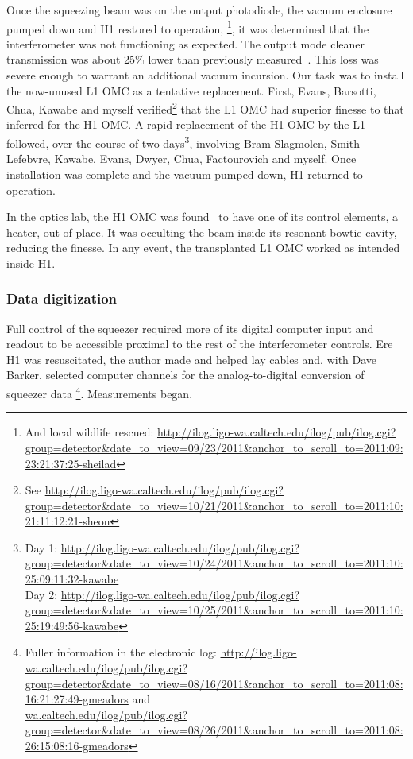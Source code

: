 Once the squeezing beam was on the output photodiode, the vacuum enclosure pumped down and H1 restored to operation,
\footnote{And local wildlife rescued: \url{http://ilog.ligo-wa.caltech.edu/ilog/pub/ilog.cgi?group=detector&date_to_view=09/23/2011&anchor_to_scroll_to=2011:09:23:21:37:25-sheilad}}, 
it was determined that the interferometer was not functioning as expected.
The output mode cleaner transmission was about 25\% lower than previously measured~\cite{Waldman2011,SmithThesis}.
This loss was severe enough to warrant an additional vacuum incursion.
Our task was to install the now-unused L1 OMC as a tentative replacement. 
First, Evans, Barsotti, Chua, Kawabe and myself verified\footnote{See \url{http://ilog.ligo-wa.caltech.edu/ilog/pub/ilog.cgi?group=detector&date_to_view=10/21/2011&anchor_to_scroll_to=2011:10:21:11:12:21-sheon}} that the L1 OMC had superior finesse to that inferred for the H1 OMC.
A rapid replacement of the H1 OMC by the L1 followed, over the course of two days\footnote{Day 1: \url{http://ilog.ligo-wa.caltech.edu/ilog/pub/ilog.cgi?group=detector&date_to_view=10/24/2011&anchor_to_scroll_to=2011:10:25:09:11:32-kawabe} \\ Day 2: \url{http://ilog.ligo-wa.caltech.edu/ilog/pub/ilog.cgi?group=detector&date_to_view=10/25/2011&anchor_to_scroll_to=2011:10:25:19:49:56-kawabe}},
involving Bram Slagmolen, Smith-Lefebvre, Kawabe, Evans, Dwyer, Chua, Factourovich and myself.
Once installation was complete and the vacuum pumped down, H1 returned to operation.

In the optics lab, the H1 OMC was found~\cite{Waldman2011} to have one of its control elements, a heater, out of place. 
It was occulting the beam inside its resonant bowtie cavity, reducing the finesse.
In any event, the transplanted L1 OMC worked as intended inside H1.


            \subsubsection{Data digitization}
            \label{data_digitization}

Full control of the squeezer required more of its digital computer input and readout to be accessible proximal to the rest of the interferometer controls.
Ere H1 was resuscitated, the author made and helped lay cables and, with Dave Barker, selected computer channels for the analog-to-digital conversion of squeezer data \footnote{Fuller information in the electronic log: \url{http://ilog.ligo-wa.caltech.edu/ilog/pub/ilog.cgi?group=detector&date_to_view=08/16/2011&anchor_to_scroll_to=2011:08:16:21:27:49-gmeadors} and \\ \url{wa.caltech.edu/ilog/pub/ilog.cgi?group=detector&date_to_view=08/26/2011&anchor_to_scroll_to=2011:08:26:15:08:16-gmeadors}}.
Measurements began.

